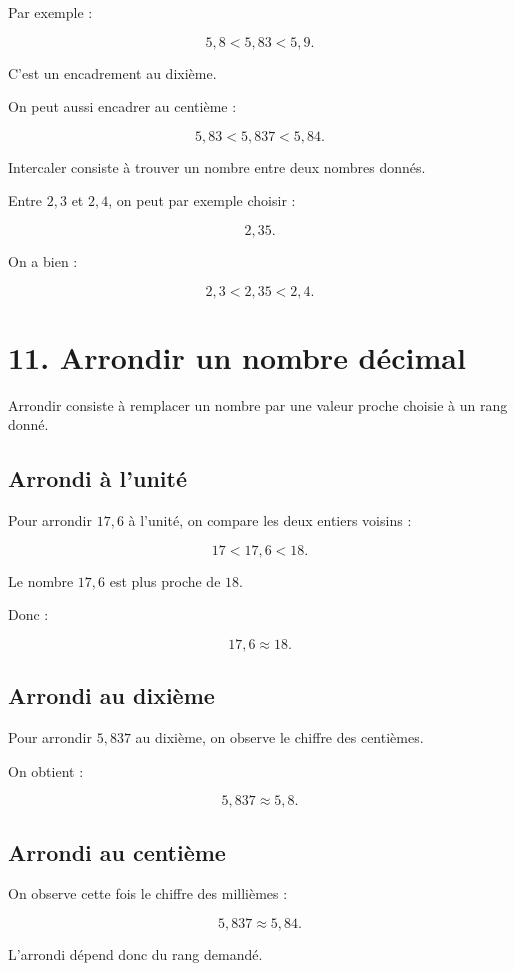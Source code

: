 Par exemple :

\[
5{,}8<5{,}83<5{,}9.
\]

C’est un encadrement au dixième.

On peut aussi encadrer au centième :

\[
5{,}83<5{,}837<5{,}84.
\]

Intercaler consiste à trouver un nombre entre deux nombres donnés.

Entre $2{,}3$ et $2{,}4$, on peut par exemple choisir :

\[
2{,}35.
\]

On a bien :

\[
2{,}3<2{,}35<2{,}4.
\]

\section{11. Arrondir un nombre décimal}

Arrondir consiste à remplacer un nombre par une valeur proche choisie à un rang donné.

\subsection{Arrondi à l’unité}

Pour arrondir $17{,}6$ à l’unité, on compare les deux entiers voisins :

\[
17<17{,}6<18.
\]

Le nombre $17{,}6$ est plus proche de $18$.

Donc :

\[
17{,}6\approx18.
\]

\subsection{Arrondi au dixième}

Pour arrondir $5{,}837$ au dixième, on observe le chiffre des centièmes.

On obtient :

\[
5{,}837\approx5{,}8.
\]

\subsection{Arrondi au centième}

On observe cette fois le chiffre des millièmes :

\[
5{,}837\approx5{,}84.
\]

L’arrondi dépend donc du rang demandé.

